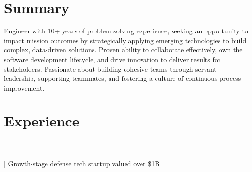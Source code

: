 %
%
\sectionsep
\section{Summary}

\raggedright

Engineer with 10+ years of problem solving experience, seeking an opportunity to impact mission outcomes by strategically applying emerging technologies to build complex, data-driven solutions.
Proven ability to collaborate effectively, own the software development lifecycle, and drive innovation to deliver results for stakeholders.
Passionate about building cohesive teams through servant leadership, supporting teammates, and fostering a culture of continuous process improvement.

\sectionsep

\section{Experience}
\\
\\
 | Growth-stage defense tech startup valued over \$1B

